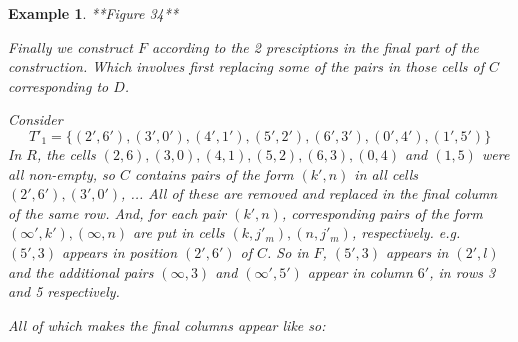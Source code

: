 \documentclass[
  11pt,
  a4paper]{book}
\newtheorem{example}{Example}
\begin{document}
\begin{example}
**Figure 34**

Finally we construct $F$ according to the 2 presciptions in
the final part of the construction. Which involves first
replacing some of the pairs in those cells of $C$
corresponding to $D$.

Consider
$$T'_1 = \{(2',6'),(3',0'),(4',1'),(5',2'),(6',3'),(0',4'),(1',5')\}$$
In $R$, the cells $(2,6),(3,0),(4,1),(5,2),(6,3),(0,4)$ and
$(1,5)$ were all non-empty, so $C$ contains pairs of the
form $(k',n)$ in all cells $(2',6'),(3',0')$, ... All of
these are removed and replaced in the final column of the
same row. And, for each pair $(k',n)$, corresponding pairs
of the form $(\infty ', k'), (\infty,n)$ are put in cells
$(k,j'_m),(n,j'_m)$, respectively.  e.g.  $(5',3)$ appears
in position $(2',6')$ of $C$. So in $F$, $(5',3)$ appears in
$(2',l)$ and the additional pairs $(\infty,3)$ and $(\infty
',5')$ appear in column $6'$, in rows 3 and 5 respectively.

All of which makes the final columns appear like so:


\end{example}
\end{document}
